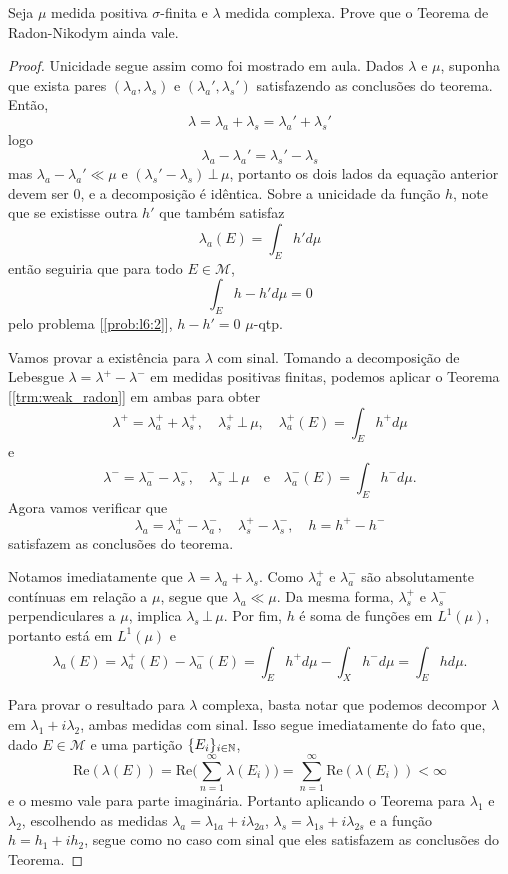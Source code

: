 \begin{problem}
    \label{prob:l6:1}
    Seja $\mu$ medida positiva $\sigma$-finita e $\lambda$ medida complexa. Prove que o Teorema de Radon-Nikodym ainda vale.
\end{problem}
\begin{proof}
    Unicidade segue assim como foi mostrado em aula. Dados $\lambda$ e $\mu$, 
    suponha que exista pares $(\lambda_a, \lambda_s)$ e $(\lambda_a', \lambda_s')$ satisfazendo as conclusões do teorema.
    Então,
    $$\lambda = \lambda_a + \lambda_s = \lambda_a' + \lambda_s'$$
    logo
    $$\lambda_a - \lambda_a' = \lambda_s' - \lambda_s$$
    mas $\lambda_a - \lambda_a' \ll \mu$ e $(\lambda_s' - \lambda_s)\, \bot \,\mu$, portanto os dois lados da equação anterior devem ser $0$,
    e a decomposição é idêntica. Sobre a unicidade da função $h$, note que se existisse outra $h'$ que também satisfaz 
    $$\lambda_a(E) = \int_E h'd\mu$$
    então seguiria que para todo $E \in \mathcal{M}$,
    $$\int_E h - h' d\mu = 0$$
    pelo problema [\ref{prob:l6:2}], $h - h' = 0$ $\mu$-qtp.

    Vamos provar a existência para $\lambda$ com sinal. Tomando a decomposição de Lebesgue $\lambda = \lambda^+ - \lambda^-$ em 
    medidas positivas finitas, podemos aplicar o Teorema [\ref{trm:weak_radon}] em ambas para obter
    $$\lambda^+ = \lambda^+_a + \lambda_{s}^+, \quad \lambda_{s}^+\,\bot\,\mu, \quad \lambda_{a}^+(E) = \int_{E} h^+ d\mu$$
    e
    $$\lambda^- = \lambda^-_a - \lambda_{s}^-, \quad \lambda_{s}^-\,\bot\,\mu \quad \text{e} \quad \lambda_{a}^-(E) = \int_{E} h^- d\mu.$$
    Agora vamos verificar que
    $$\lambda_a = \lambda_a^+ - \lambda_a^-, \quad \lambda_{s}^+ - \lambda_s^- ,\quad h = h^+ - h^-$$
    satisfazem as conclusões do teorema. 
    
    Notamos imediatamente que $\lambda = \lambda_a + \lambda_s$. Como $\lambda_a^+$ e $\lambda_a^-$ são absolutamente contínuas em relação a $\mu$,
    segue que $\lambda_a \ll \mu$. Da mesma forma, $\lambda_s^+$ e $\lambda_s^-$ perpendiculares a $\mu$, implica $\lambda_s \,\bot\, \mu$.
    Por fim, $h$ é soma de funções em $L^1(\mu)$, portanto está em $L^1(\mu)$ e
    $$\lambda_a(E) = \lambda_a^+(E) - \lambda_a^-(E) = \int_E h^+ d\mu - \int_X h^- d\mu = \int_E hd\mu.$$

    Para provar o resultado para $\lambda$ complexa, basta notar que podemos decompor $\lambda$ em $\lambda_1 + i \lambda_2$, 
    ambas medidas com sinal. Isso segue imediatamente do fato que, dado $E \in \mathcal{M}$ e uma partição $\{E_i\}_{i \in \mathbb{N}}$,
    $$\text{Re}(\lambda(E)) = \text{Re}\bigg(\sum_{n=1}^{\infty} \lambda(E_i)\bigg) = \sum_{n=1}^{\infty} \text{Re}(\lambda(E_i)) < \infty$$
    e o mesmo vale para parte imaginária. Portanto aplicando o Teorema para $\lambda_1$ e $\lambda_2$, escolhendo as medidas
    $\lambda_a = \lambda_{1a} + i\lambda_{2a}$, $\lambda_s = \lambda_{1s} + i\lambda_{2s}$ e a função $h = h_1 + ih_2$, segue como no caso
    com sinal que eles satisfazem as conclusões do Teorema.

    
\end{proof}

